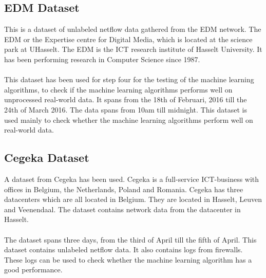 \subsection{EDM Dataset}
This is a dataset of unlabeled netflow data gathered from the EDM network. The EDM or the Expertise centre for Digital Media, which is located at the science park at UHasselt. The EDM is the ICT research institute of Hasselt University. It has been performing research in Computer Science since 1987.  \\
\\
This dataset has been used for step four for the testing of the machine learning algorithms, to check if the machine learning algorithms performs well on unprocessed real-world data. It spans from the 18th of Februari, 2016 till the 24th of March  2016. The data spans from 10am till midnight. This dataset is used mainly to check whether the machine learning algorithms perform well on real-world data.

\subsection{Cegeka Dataset}
A dataset from Cegeka has been used. Cegeka is a full-service ICT-business with offices in Belgium, the Netherlands, Poland and Romania. Cegeka has three datacenters which are all located in Belgium. They are located in Hasselt, Leuven and Veenendaal. The dataset contains network data from the datacenter in Hasselt. \\
\\
The dataset spans three days, from the third of April till the  fifth of April. This dataset contains unlabeled netflow data. It also contains logs from firewalls. These logs can be used to check whether the machine learning algorithm has a good performance. 

